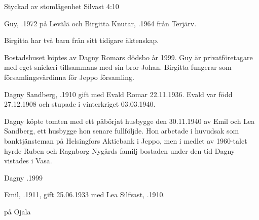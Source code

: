 Styckad av stomlägenhet Silvast 4:10


%
Guy, .1972 på Levälä och Birgitta Knutar, .1964 från Terjärv.
\begin{jhchildren}
  \item {}
\end{jhchildren}

Birgitta har två barn från sitt tidigare äktenskap.
\begin{jhchildren}
  \item {}
  \item {}
\end{jhchildren}
Bostadshuset köptes av Dagny Romars dödsbo år 1999. Guy är privatföretagare med eget snickeri tillsammans med sin bror Johan. Birgitta fungerar som församlingsvärdinna för Jeppo församling.


%
Dagny Sandberg, .1910 gift med Evald Romar 22.11.1936. Evald var född 27.12.1908 och stupade i vinterkriget 03.03.1940.
\begin{jhchildren}
  \item {}
  \item {}
\end{jhchildren}
Dagny köpte tomten med ett påbörjat husbygge den 30.11.1940 av Emil och Lea Sandberg, ett husbygge hon senare fullföljde. Hon arbetade i huvudsak som banktjänsteman på Helsingfors Aktiebank i Jeppo, men i medlet av 1960-talet hyrde Ruben och Ragnborg Nygårds familj bostaden under den tid Dagny vistades i Vasa.

Dagny .1999


%
Emil, .1911, gift 25.06.1933 med Lea Silfvast, .1910.
\begin{jhchildren}
  \item {}
  \item {}
  \item {} på Ojala
\end{jhchildren}

